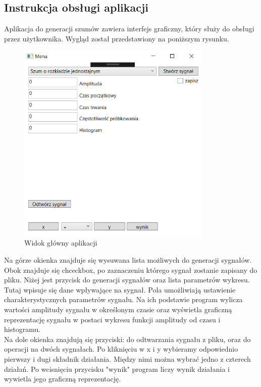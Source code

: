 \documentclass[12pt]{article}
\begin{document}
\subsection{Instrukcja obsługi aplikacji}
Aplikacja do generacji szumów zawiera interfejs graficzny, który służy do obsługi przez użytkownika. Wygląd został przedstawiony na poniższym rysunku.
\newpage
\begin{figure}[h!]
 \centering
 \includegraphics[width=9.3cm]{ui1.PNG}
 \vspace{-0.3cm}
 \caption{Widok główny aplikacji}
 \label{Widok_aplikacjis}
\end{figure}

Na górze okienka znajduje się wysuwana lista możliwych do generacji sygnałów. Obok znajduje się chceckbox, po zaznaczeniu którego sygnał zostanie zapisany do pliku.
Niżej jest przycisk do generacji sygnałów oraz lista parametrów wykresu. Tutaj wpisuje się dane wpływające na sygnał.
Pola umożliwiają ustawienie charakterystycznych parametrów sygnału. Na ich podstawie program wylicza wartości amplitudy sygnału w określonym czasie oraz wyświetla graficzną reprezentację sygnału w postaci wykresu funkcji amplitudy od czasu i histogramu.\\

Na dole okienka znajdują się przyciski: do odtwarzania sygnału z pliku, oraz do operacji na dwóch sygnałach. Po kliknięciu w x i y wybieramy odpowiednio pierwszy i dugi składnik działania. Między nimi można wybrać jedno z czterech działań.  Po wcisnięciu przycisku "wynik" program liczy wynik działania i wywietla jego graficzną reprezentację. 
\end{document}
